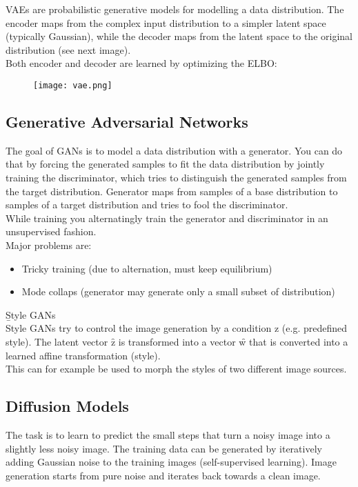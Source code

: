 VAEs are probabilistic generative models for modelling a data distribution. The encoder maps from the complex input distribution to a simpler latent space (typically Gaussian), while the decoder maps from the latent space to the original distribution (see next image).\\
Both encoder and decoder are learned by optimizing the ELBO:
\begin{figure}[ht!]
    \centering
    \texttt{[image: vae.png]}
\end{figure}

\subsection{Generative Adversarial Networks}
The goal of GANs is to model a data distribution with a generator. You can do that by forcing the generated samples to fit the data distribution by jointly training the discriminator, which tries to distinguish the generated samples from the target distribution. Generator maps from samples of a base distribution to samples of a target distribution and tries to fool the discriminator.\\
While training you alternatingly train the generator and discriminator in an unsupervised fashion.\\

Major problems are:
\begin{itemize}
    \item Tricky training (due to alternation, must keep equilibrium)
    \item Mode collaps (generator may generate only a small subset of distribution)
\end{itemize}

\newpage

\b{Style GANs\\[.5em]}
Style GANs try to control the image generation by a condition z (e.g. predefined style). The latent vector \f{z} is transformed into a vector \f{w} that is converted into a learned affine transformation (style).\\
This can for example be used to morph the styles of two different image sources.

\subsection{Diffusion Models}
The task is to learn to predict the small steps that turn a noisy image into a slightly less noisy image. The training data can be generated by iteratively adding Gaussian noise to the training images (self-supervised learning). Image generation starts from pure noise and iterates back towards a clean image.\\


